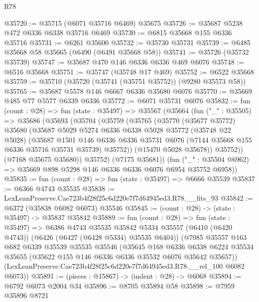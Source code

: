 \begin{lexlean}{R78}
\begin{coremodule}
@35720 := @35715 (@6071 @35716 @6469) @35675
@35726 := @35687 @5238 @472 @6336 @6338 @35716 @6469
@35730 := @6815 @35668 @155 @6336 @35716
@35731 := @6261 @35600
@35732 := @35730 @35731
@35739 := @6485 @35668 @58 @35665 (@6490 (@6491 @35668 @58))
@35741 := @35726 (@35732 @35739)
@35747 := @35687 @470 @146 @6336 @6336 @469 @6076
@35748 := @6516 @35668
@35751 := @35747 (@35748 @17 @469)
@35752 := @6522 @35668
@35759 := @35710 (@35720 (@35741 (@35751 @35752)) (@9280 @35573 @58))
@35765 := @35687 @5578 @146 @6667 @6336 @35680 @6076
@35770 := @35669 @485 @77 @5577 @6339 @6336
@35772 := @6071 @35731 @6076
@35832 := fun (count : @28) =>
  fun (state : @35497) =>
  @35567
    (@35664
      (fun ("_" : @35505) =>
      @35686
        (@35693
          (@35704
            (@35759
              (@35765
                (@35770
                  (@35677 @35772)
                  @35680
                  (@35687
                    @5029
                    @5274
                    @6336
                    @6338
                    @5028
                    @35772
                    (@35748 @22 @5028)
                    (@35687
                      @1501
                      @146
                      @6336
                      @6336
                      @35731
                      @6076
                      (@7144 @35668 @155 @6336 @35716 @35731 @35739)
                      @35752))
                  (@15470 @5028 @35678))
                @35752))
            (@7168 @35675 @35680))
          @35752)
        (@7175 @35681))
      (fun ("_" : @35504 @6962) => @35669 @898 @5298 @146 @6336 @6336 @6076 @6954 @35752 @6958))
@35835 := fun (count : @28) => fun (state : @35497) => @6666 @35539
@35837 := @6366 @4743 @35535
@35838 := LexLeanPreserve.Cae723b4f28f25c6d220e7f7d64945ed3.R78.__fits_93
@35842 := @6372 (@35838 @6082 @6073) @35546
@35845 := (count : @28) -> (state : @35497) -> @35837 @35842
@35889 := fun (count : @28) =>
  fun (state : @35497) =>
  @6386
    @4743
    @35535
    @35842
    @5334
    @35557
    (@6410 (@6420 @4743))
    (@6426 (@6427 (@6428 @5334) @35535 @6404))
    (@7085
      @35557
      @163
      @682
      @6339
      @35539
      @35535
      @35546
      (@35645
        @168
        @6336
        @6338
        @6224
        @35534
        @35655
        (@35622 @155 @146 @6336 @6336 @35532 @6076 @35642 @35657))
      (LexLeanPreserve.Cae723b4f28f25c6d220e7f7d64945ed3.R78.__rel_100 @6082 @6073))
@35891 := (pieces : @15867) -> (indent : @28) -> @6068
@35894 := @6792 @6073 @2004 @34
@35896 := @8705 @35894 @58
@35898 := @7959 @35896 @8721

\end{coremodule}
\end{lexlean}
